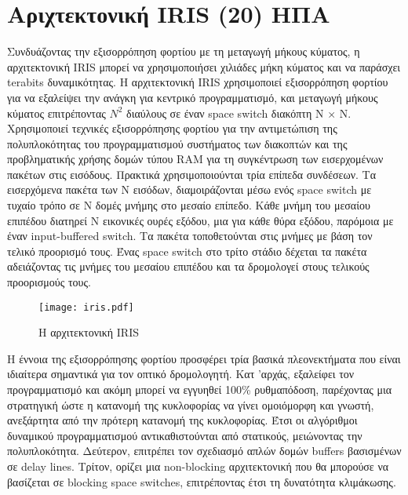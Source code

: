 
\section{Αριχτεκτονική IRIS (20) ΗΠΑ}


Συνδυάζοντας την εξισορρόπηση φορτίου με τη μεταγωγή μήκους κύματος, η
αρχιτεκτονική IRIS μπορεί να χρησιμοποιήσει χιλιάδες μήκη κύματος και
να παράσχει terabits δυναμικότητας. Η αρχιτεκτονική IRIS χρησιμοποιεί
εξισορρόπηση φορτίου για να εξαλείψει την ανάγκη για κεντρικό
προγραμματισμό, και μεταγωγή μήκους κύματος επιτρέποντας $N^2$
διαύλους σε έναν space switch διακόπτη N × N. Xρησιμοποιεί τεχνικές
εξισορρόπησης φορτίου για την αντιμετώπιση της πολυπλοκότητας του
προγραμματισμού συστήματος των διακοπτών και της προβληματικής χρήσης
δομών τύπου RAM για τη συγκέντρωση των εισερχομένων πακέτων στις
εισόδους. Πρακτικά χρησιμοποιούνται τρία επίπεδα συνδέσεων. Τα
εισερχόμενα πακέτα των N εισόδων, διαμοιράζονται μέσω ενός space
switch με τυχαίο τρόπο σε Ν δομές μνήμης στο μεσαίο επίπεδο. Κάθε
μνήμη του μεσαίου επιπέδου διατηρεί Ν εικονικές ουρές εξόδου, μια για
κάθε θύρα εξόδου, παρόμοια με έναν input-buffered switch. Τα πακέτα
τοποθετούνται στις μνήμες με βάση τον τελικό προορισμό τους. Ένας
space switch στο τρίτο στάδιο δέχεται τα πακέτα αδειάζοντας τις μνήμες
του μεσαίου επιπέδου και τα δρομολογεί στους τελικούς προορισμούς
τους.

\begin{figure}[h]
  \centering
  \texttt{[image: iris.pdf]}
  \caption{Η αρχιτεκτονική IRIS}
  \label{fig:iris}
\end{figure}

H έννοια της εξισορρόπησης φορτίου προσφέρει τρία βασικά πλεονεκτήματα
που είναι ιδιαίτερα σημαντικά για τον οπτικό δρομολογητή. Κατ 'αρχάς,
εξαλείφει τον προγραμματισμό και ακόμη μπορεί να εγγυηθεί 100\%
ρυθμαπόδοση, παρέχοντας μια στρατηγική ώστε η κατανομή της κυκλοφορίας
να γίνει ομοιόμορφη και γνωστή, ανεξάρτητα από την πρότερη κατανομή
της κυκλοφορίας. Έτσι οι αλγόριθμοι δυναμικού προγραμματισμού
αντικαθιστούνται από στατικούς, μειώνοντας την
πολυπλοκότητα. Δεύτερον, επιτρέπει τον σχεδιασμό απλών δομών buffers
βασισμένων σε delay lines. Τρίτον, ορίζει μια non-blocking
αρχιτεκτονική που θα μπορούσε να βασίζεται σε blocking space switches,
επιτρέποντας έτσι τη δυνατότητα κλιμάκωσης.

